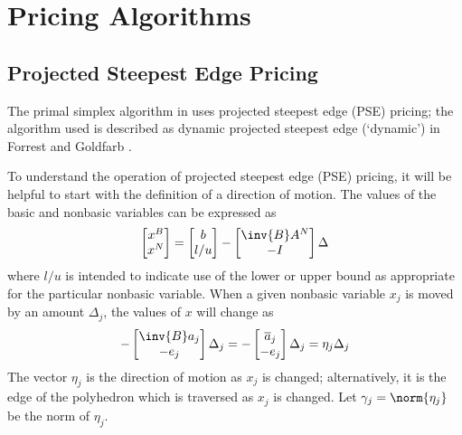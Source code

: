 \section{Pricing Algorithms}
\label{sec:PricingAlgorithms}

\subsection{Projected Steepest Edge Pricing}
\label{sec:PSEPricing}

The primal simplex algorithm in \dylp uses projected steepest edge (PSE)
pricing;
the algorithm used is described as dynamic projected steepest edge
(`dynamic') in Forrest and Goldfarb \cite{For92}.

To understand the operation of projected steepest edge (PSE) pricing, it
will be helpful to start with the definition of a direction of motion.
The values of the basic and nonbasic variables can be expressed as
\begin{equation} \label{eqn:allPrimalDirs}
\begin{bmatrix} x^B \\ x^N \end{bmatrix} =
  \begin{bmatrix} b \\ l/u \end{bmatrix} -
  \begin{bmatrix} \inv{B} A^N \\ -I \end{bmatrix} \Delta
\end{equation}
where $l/u$ is intended to indicate use of the lower or upper bound as
appropriate for the particular nonbasic variable.
When a given nonbasic variable $x_j$ is moved by an amount $\Delta_j$, the
values of $x$ will change as
\begin{equation} \label{eqn:onePrimalDir}
  -\begin{bmatrix} \inv{B} a_j \\ -e_j \end{bmatrix} \Delta_j =
  -\begin{bmatrix} \overline{a}_j \\ -e_j \end{bmatrix} \Delta_j =
  \eta_j\Delta_j
\end{equation}
The vector $\eta_j$ is the direction of motion as $x_j$ is changed;
alternatively, it is the edge of the polyhedron which is traversed as $x_j$ is
changed.
Let $\gamma_j = \norm{\eta_j}$ be the norm of $\eta_j$.

